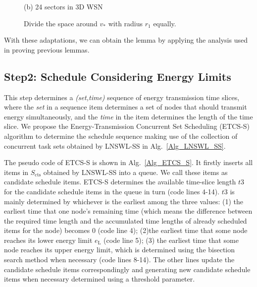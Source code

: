 \documentclass[journal,10pt]{IEEEtran}
\begin{document}
\begin{IEEEproof}
\begin{figure}[htb]
{\begin{minipage}[c]{0.22\textwidth}
\parbox{\linewidth}{\centering\small{(b) 24 sectors in 3D WSN}}
\end{minipage}
}
\caption{Divide the space around $v_{*}$ with radius $r_1$ equally.}
\label{fig_spacearound_div}
\end{figure}

With these adaptations, we can obtain the lemma by applying the analysis used in proving previous lemmas.
\end{IEEEproof}

\subsection{Step2: Schedule Considering Energy Limits}

This step determines a \textit{(set,time)} sequence of energy transmission time slices, where the \textit{set} in a sequence item determines a set of nodes that should transmit energy simultaneously, and the \textit{time} in the item determines the length of the time slice. We propose the Energy-Transmission Concurrent Set Scheduling (ETCS-S) algorithm to determine the schedule sequence making use of the collection of concurrent task sets obtained by LNSWL-SS in Alg.~\ref{Alg_LNSWL_SS}.

The pseudo code of ETCS-S is shown in Alg.~\ref{Alg_ETCS_S}. It firstly inserts all items in $S_\text{cts}$ obtained by LNSWL-SS into a queue. We call these items as candidate schedule items. ETCS-S determines the available time-slice length $t3$ for the candidate schedule items in the queue in turn (code lines 4-14). $t3$ is mainly determined by whichever is the earliest among the three values: (1) the earliest time that one node's remaining time (which means the difference between the required time length and the accumulated time lengths of already scheduled items for the node) becomes 0 (code line 4); (2)the earliest time that some node reaches its lower energy limit $e_\text{L}$ (code line 5); (3) the earliest time that some node reaches its upper energy limit, which is determined using the bisection search method when necessary (code lines 8-14). The other lines update the candidate schedule items correspondingly and generating new candidate schedule items when necessary determined using a threshold parameter.
\end{document}
